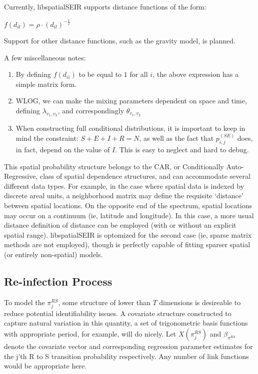 \documentclass[12pt]{article}
\newcommand \mbreak {\\ \vspace{0.1in}}
\begin{document}
Currently, libspatialSEIR supports distance functions of the form:

\begin{center}
    $f(d_{il}) = \rho \cdot (d_{il})^{-\frac{1}{2}}$
\end{center}

Support for other distance functions, such as the gravity model, is planned. \mbreak


A few miscellaneous notes: 
\begin{enumerate}
    \item By defining $f(d_{ii})$ to be equal to $1$ for all $i$, the above expression has a simple 
        matrix form. 
    \item WLOG, we can make the mixing parameters dependent on space and time, defining $\lambda_{v_1, v_2}$,
        and correspondingly $\theta_{v_1,v_2}$
    \item When constructing full conditional distributions, it is important to keep in mind the constraint:
        $S+E+I+R=N$, as well as the fact that $p_{i,j}^{(SE)}$ does, in fact, depend on the value of $I$.
        This is easy to neglect and hard to debug.  \\
        
\end{enumerate}
This spatial probability structure belongs to the CAR, or Conditionally Auto-Regressive, class
of spatial dependence structures, and can accommodate several different data types. For example, 
in the case where spatial data is indexed by discrete areal units, a neighborhood matrix may define
the requisite `distance' between spatial locations. On the opposite end of the spectrum, spatial locations 
may occur on a continuum (ie, latitude and longitude). In this case, a more usual distance definition of 
distance can be employed (with or without an explicit spatial range). libspatialSEIR is optomized for the 
second case (ie, sparse matrix methods are not employed), though is perfectly
capable of fitting sparser spatial (or entirely non-spatial) models.\\ 


\subsection{Re-infection Process}


To model the $\pi_j^{RS}$, some structure of lower than $T$ dimensions is desireable to reduce potential 
identifiability issues. A covariate structure constructed to capture natural variation in this quantity,
a set of trigonometric basis functions with appropriate period, for example, will do nicely. Let $X(\pi_j^{RS})$ and $\beta_{\pi^{RS}}$ 
denote the covariate vector and corresponding regression parameter estimates 
for the j'th R to S transition probability respectively. Any number of link functions would be appropriate here.
 
\end{document}

